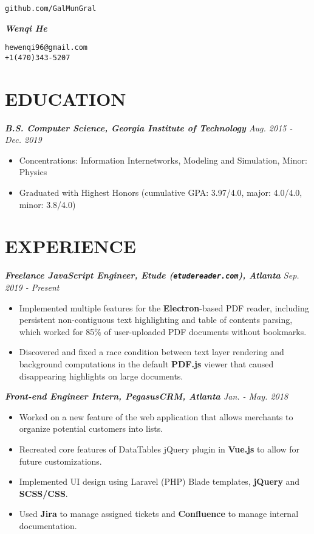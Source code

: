 \documentclass[10pt]{article}
\begin{document}
\noindent
\parbox{0.25\textwidth}{\hfill\texttt{github.com/GalMunGral}}
\parbox{0.5\textwidth}{\centerline{\Huge\slshape\bfseries Wenqi He}}
\parbox{0.25\textwidth}{\texttt{hewenqi96@gmail.com\\+1(470)343-5207}}
%
\vspace{-1em}
\section*{EDUCATION}
{\itshape 
{\bfseries B.S. Computer Science, Georgia Institute of Technology} \hfill Aug. 2015 - Dec. 2019}
\begin{itemize}[leftmargin=15pt, noitemsep, topsep=0pt]
	\item Concentrations: Information Internetworks, Modeling and Simulation, Minor: Physics
	\item  Graduated with Highest Honors (cumulative GPA: 3.97/4.0, major: 4.0/4.0, minor: 3.8/4.0)
\end{itemize}
%
\vspace{-0.5em}
\section*{EXPERIENCE}
{\itshape {\bfseries Freelance JavaScript Engineer, Etude (\texttt{etudereader.com}), Atlanta} \hfill Sep. 2019 - Present}
\begin{itemize}[leftmargin=15pt, noitemsep, topsep=0pt]
\item Implemented multiple features for the \textbf{Electron}-based PDF reader, including persistent non-contiguous text highlighting and table of contents parsing, which worked for 85\% of user-uploaded PDF documents without bookmarks.
\item Discovered and fixed a race condition between text layer rendering and background computations in the default \textbf{PDF.js} viewer that caused disappearing highlights on large documents.
\end{itemize}
\vspace{0.5em}
%
{\itshape {\bfseries Front-end Engineer Intern, PegasusCRM, Atlanta} \hfill Jan. - May. 2018}
\begin{itemize}[leftmargin=15pt, noitemsep, topsep=0pt]
\item Worked on a new feature of the web application that allows merchants to organize potential customers into lists.
\item Recreated core features of DataTables jQuery plugin in \textbf{Vue.js} to allow for future customizations.
\item Implemented UI design using Laravel (PHP) Blade templates, \textbf{jQuery} and \textbf{SCSS/CSS}.
\item Used \textbf{Jira} to manage assigned tickets and \textbf{Confluence} to manage internal documentation.
\end{itemize}
%
\vspace{-0.5em}
\end{document}
